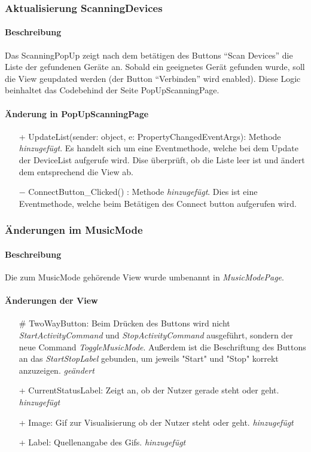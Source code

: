 \documentclass[a4paper,12pt]{article}
\begin{document}
\subsubsection{Aktualisierung ScanningDevices}
\paragraph{Beschreibung}
Das ScanningPopUp zeigt nach dem betätigen des Buttons ``Scan Devices'' die Liste der gefundenen Geräte an. Sobald ein geeignetes Gerät gefunden wurde, soll die View geupdated werden (der Button ``Verbinden'' wird enabled). Diese Logic beinhaltet das Codebehind der Seite PopUpScanningPage.

\paragraph{Änderung in PopUpScanningPage}
\begin{itemize}
	\item[+] UpdateList(sender: object, e: PropertyChangedEventArgs): Methode \textit{hinzugefügt}. Es handelt sich um eine Eventmethode, welche bei dem Update der DeviceList aufgerufe wird. Dise überprüft, ob die Liste leer ist und ändert dem entsprechend die View ab.
	\item[$-$] ConnectButton\_Clicked() : Methode \textit{hinzugefügt}. Dies ist eine Eventmethode, welche beim Betätigen des Connect button aufgerufen wird.
\end{itemize} 

\subsubsection{Änderungen im MusicMode}
\paragraph{Beschreibung}
Die zum MusicMode gehörende View wurde umbenannt in \textit{MusicModePage}.

\paragraph{Änderungen der View}
\begin{itemize}
	\item[\#] TwoWayButton: Beim Drücken des Buttons wird nicht
			\textit{StartActivityCommand} und \textit{StopActivityCommand}
			ausgeführt, sondern der neue Command \textit{ToggleMusicMode}.
			Außerdem ist die Beschriftung des Buttons an das \textit{StartStopLabel}
			gebunden, um jeweils "Start" und "Stop" korrekt anzuzeigen. \textit{geändert}
	\item[+] CurrentStatusLabel: Zeigt an, ob der Nutzer gerade steht oder geht. \textit{hinzugefügt}
	\item[+] Image: Gif zur Visualisierung ob der Nutzer steht oder geht. \textit{hinzugefügt}
	\item[+] Label: Quellenangabe des Gifs. \textit{hinzugefügt}
\end{itemize}
\end{document}
